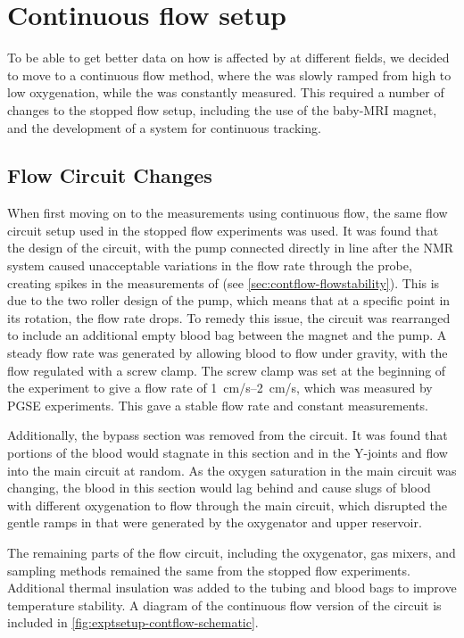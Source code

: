 \section{Continuous flow setup}
\label{sec:exptsetup-contflow}

To be able to get better data on how \Ttwo is affected by \SOtwo at different fields, we decided to move to a continuous flow method, where the \SOtwo was slowly ramped from high to low oxygenation, while the \Ttwo was constantly measured.
This required a number of changes to the stopped flow setup, including the use of the baby-MRI magnet, and the development of a system for continuous \SOtwo tracking.

\subsection{Flow Circuit Changes}
When first moving on to the measurements using continuous flow, the same flow circuit setup used in the stopped flow experiments was used.
It was found that the design of the circuit, with the pump connected directly in line after the NMR system caused unacceptable variations in the flow rate through the probe, creating spikes in the measurements of \Ttwo (see \autoref{sec:contflow-flowstability}).
This is due to the two roller design of the pump, which means that at a specific point in its rotation, the flow rate drops.
To remedy this issue, the circuit was rearranged to include an additional empty blood bag between the magnet and the pump.
A steady flow rate was generated by allowing blood to flow under gravity, with the flow regulated with a screw clamp.
The screw clamp was set at the beginning of the experiment to give a flow rate of \SIrange{1}{2}{cm/s}, which was measured by PGSE experiments.
This gave a stable flow rate and constant \Ttwo measurements.

Additionally, the bypass section was removed from the circuit.
It was found that portions of the blood would stagnate in this section and in the Y-joints and flow into the main circuit at random.
As the oxygen saturation in the main circuit was changing, the blood in this section would lag behind and cause slugs of blood with different oxygenation to flow through the main circuit, which disrupted the gentle ramps in \SOtwo that were generated by the oxygenator and upper reservoir.

The remaining parts of the flow circuit, including the oxygenator, gas mixers, and sampling methods remained the same from the stopped flow experiments.
Additional thermal insulation was added to the tubing and blood bags to improve temperature stability.
A diagram of the continuous flow version of the circuit is included in \autoref{fig:exptsetup-contflow-schematic}.

